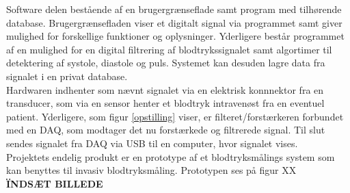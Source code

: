 Software delen bestående af en brugergrænseflade samt program med tilhørende database. Brugergrænsefladen viser et digitalt signal via programmet samt giver mulighed for forskellige funktioner og oplysninger. Yderligere består programmet af en mulighed for en digital filtrering af blodtrykssignalet samt algortimer til detektering af systole, diastole og puls. Systemet kan desuden lagre data fra signalet i en privat database.\\[1ex]

Hardwaren indhenter som nævnt signalet via en elektrisk konnnektor fra en transducer, som via en sensor henter et blodtryk intravenøst fra en eventuel patient. Yderligere, som figur \ref{opstilling} viser, er filteret/forstærkeren forbundet med en DAQ, som modtager det nu forstærkede og filtrerede signal. Til slut sendes signalet fra DAQ via USB til en computer, hvor signalet vises.\\[1ex]
Projektets endelig produkt er en prototype af et blodtryksmålings system som kan benyttes til invasiv blodtryksmåling. Prototypen ses på figur XX \\
\textbf{ÏNDSÆT BILLEDE}


